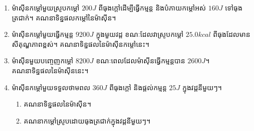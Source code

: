 \begin{example}
	\begin{enumerate}[m]
		\item ម៉ាសុីនកម្តៅមួយស្រូបកម្តៅ $200J$ ពីធុងក្តៅដើម្បីធ្វើកម្មន្ត និងបំភាយកម្តៅអស់ $160J$ ទៅធុងត្រជាក់។ គណនាទិន្នផលកម្តៅនៃម៉ាសុីន។
		\item ម៉ាសុីនកម្តៅមួយធ្វើកម្មន្ត $9200J$ ក្នុងមួយវដ្ត ខណៈដែលវាស្រូបកម្តៅ $25.0kcal$ ពីធុងដែលមានសីតុណ្ហភាពខ្ពស់។ គណនាទិន្នផលនៃម៉ាសុីនកម្តៅនេះ។
		\item ម៉ាសុីនមួយបញ្ចេញកម្តៅ $8200J$ ខណៈពេលដែលម៉ាសុីនធ្វើកម្មន្តបាន $2600J$។\\ គណនាទិន្នផលនៃម៉ាសុីននេះ។
		\item ម៉ាសុីនកម្តៅមួយទទួលថាមពល $360J$ ពីធុងក្តៅ និងផ្តល់កម្មន្ត $25J$ ក្នុងវដ្តនីមួយៗ។
		\begin{enumerate}
			\item គណនាទិន្នផលនៃម៉ាសុីន។
			\item គណនាកម្តៅស្រូបដោយធុងត្រជាក់ក្នុងវដ្តនីមួយៗ។
		\end{enumerate}
	\end{enumerate}
\end{example}
